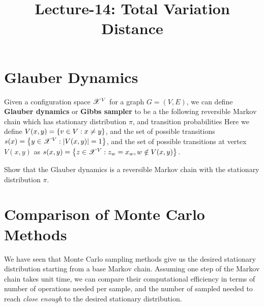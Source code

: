 \documentclass[letterpaper,english,10pt]{article}
\title{Lecture-14: Total Variation Distance}
\begin{document}
\maketitle
\section{Glauber Dynamics}
\begin{defn}
Given a configuration space $\mathscr{X}^V$ for a graph $G = (V,E)$, we can define \textbf{Glauber dynamics} or \textbf{Gibbs sampler} to be a the following reversible Markov chain which has stationary distribution $\pi$, 
and transition probabilities 
Here we define $V(x,y) = \left\{v \in V: x \neq y\right\}$, and the set of possible transitions $s(x) = \left\{y \in \mathscr{X}^V: \left\lvert V(x,y)\right\rvert = 1\right\}$, and the set of possible transitions at vertex $V(x,y)$ as  $s(x,y)= \left\{z \in \mathscr{X}^V: z_w = x_w, w \notin V(x,y)\right\}$. 
\end{defn}
\begin{exerc}
Show that the Glauber dynamics is a reversible Markov chain with the stationary distribution $\pi$. 
\end{exerc}
\section{Comparison of Monte Carlo Methods}
We have seen that Monte Carlo sampling methods give us the desired stationary distribution starting from a base Markov chain. 
Assuming one step of the Markov chain takes unit time, 
we can compare their computational efficiency in terms of number of operations needed per sample,  
and the number of sampled needed to reach \textit{close enough} to the desired stationary distribution. 
\end{document}
